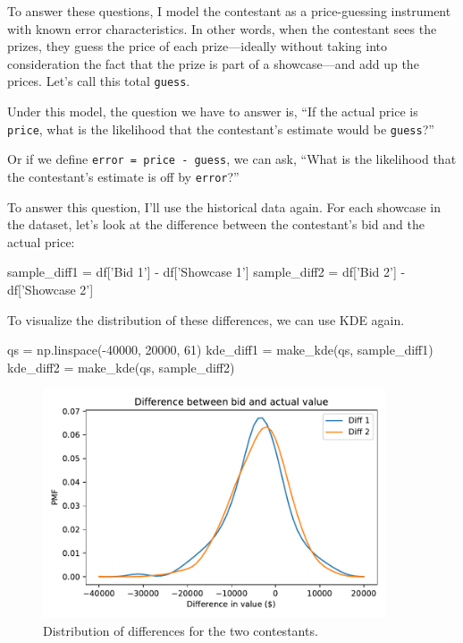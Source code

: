 \documentclass[12pt]{book}
\theoremstyle{exercise}
\newcommand{\py}[1]{{\tt #1}}%
\begin{document}
To answer these questions, I model the contestant
as a price-guessing instrument with known error characteristics.
In other words, when the contestant sees the prizes, they
guess the price of each prize---ideally without taking into
consideration the fact that the prize is part of a showcase---and
add up the prices.  Let's call this total \py{guess}.

Under this model, the question we have to answer is, ``If the
actual price is \py{price}, what is the likelihood that the
contestant's estimate would be \py{guess}?''

Or if we define \py{error = price - guess}, we can ask, ``What is the likelihood that the contestant's estimate is off by \py{error}?''

To answer this question, I'll use the historical data again.
For each showcase in the dataset, let's look at the difference between the contestant's bid and the actual price:

\begin{code}
sample_diff1 = df['Bid 1'] - df['Showcase 1']
sample_diff2 = df['Bid 2'] - df['Showcase 2']
\end{code}

To visualize the distribution of these differences, we can use KDE again.

\begin{code}
qs = np.linspace(-40000, 20000, 61)
kde_diff1 = make_kde(qs, sample_diff1)
kde_diff2 = make_kde(qs, sample_diff2)
\end{code}

\begin{figure}
\centerline{\includegraphics[width=4in]{figs/fig08-02.pdf}}
\caption{Distribution of differences for the two contestants.}
\label{fig08-02}
\end{figure}
\end{document}
